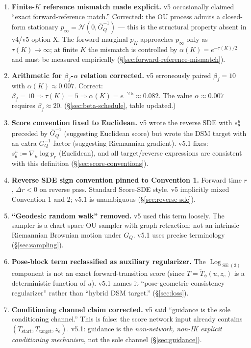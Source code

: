 \documentclass[11pt,a4paper]{article}
\DeclareMathOperator{\Log}{Log}
\DeclareMathOperator{\SE}{SE}
\newcommand{\N}{\mathcal{N}}
\newcommand{\GQ}{G_Q}
\newcommand{\GQbar}{\bar G_Q}
\begin{document}
\begin{enumerate}[noitemsep, leftmargin=*]
    \item \textbf{Finite-$K$ reference mismatch made explicit.} v5 occasionally claimed ``exact forward-reference match.'' Corrected: the OU process admits a closed-form stationary $p_\infty = \N(0, \GQbar^{-1})$ — this is the structural property absent in v4/v5-option-X. The forward marginal $p_K$ approaches $p_\infty$ only as $\tau(K) \to \infty$; at finite $K$ the mismatch is controlled by $\alpha(K) = e^{-\tau(K)/2}$ and must be measured empirically (\S\ref{sec:forward-reference-mismatch}).
    \item \textbf{Arithmetic for $\beta_f$-$\alpha$ relation corrected.} v5 erroneously paired $\beta_f = 10$ with $\alpha(K) \approx 0.007$. Correct: $\beta_f = 10 \Rightarrow \tau(K) = 5 \Rightarrow \alpha(K) = e^{-2.5} \approx 0.082$. The value $\alpha \approx 0.007$ requires $\beta_f \approx 20$. (\S\ref{sec:beta-schedule}, table updated.)
    \item \textbf{Score convention fixed to Euclidean.} v5 wrote the reverse SDE with $s_\theta^u$ preceded by $\GQbar^{-1}$ (suggesting Euclidean score) but wrote the DSM target with an extra $\GQ^{-1}$ factor (suggesting Riemannian gradient). v5.1 fixes: $s_\theta^u := \nabla_u \log p_r$ (Euclidean), and all target/reverse expressions are consistent with this definition (\S\ref{sec:score-conventions}).
    \item \textbf{Reverse SDE sign convention pinned to Convention 1.} Forward time $r$, $\Delta r < 0$ on reverse pass. Standard Score-SDE style. v5 implicitly mixed Convention 1 and 2; v5.1 is unambiguous (\S\ref{sec:reverse-sde}).
    \item \textbf{``Geodesic random walk'' removed.} v5 used this term loosely. The sampler is a chart-space OU sampler with graph retraction; not an intrinsic Riemannian Brownian motion under $\GQ$. v5.1 uses precise terminology (\S\ref{sec:sampling}).
    \item \textbf{Pose-block term reclassified as auxiliary regularizer.} The $\Log_{\SE(3)}$ component is not an exact forward-transition score (since $T = \widetilde T_\phi(u, z_e)$ is a deterministic function of $u$). v5.1 names it ``pose-geometric consistency regularizer'' rather than ``hybrid DSM target.'' (\S\ref{sec:loss}).
    \item \textbf{Conditioning channel claim corrected.} v5 said ``guidance is the sole conditioning channel.'' This is false: the score network input already contains $(T_\text{start}, T_\text{target}, z_e)$. v5.1: guidance is the \emph{non-network, non-IK explicit conditioning mechanism}, not the sole channel (\S\ref{sec:guidance}).

\end{enumerate}
\end{document}
